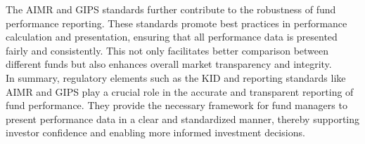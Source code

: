 \documentclass[a4paper,10pt]{article}
\begin{document}
\noindent The AIMR and GIPS standards further contribute to the robustness of fund performance reporting. These standards promote best practices in performance calculation and presentation, ensuring that all performance data is presented fairly and consistently. This not only facilitates better comparison between different funds but also enhances overall market transparency and integrity. \\

\noindent In summary, regulatory elements such as the KID and reporting standards like AIMR and GIPS play a crucial role in the accurate and transparent reporting of fund performance. They provide the necessary framework for fund managers to present performance data in a clear and standardized manner, thereby supporting investor confidence and enabling more informed investment decisions. \\
\end{document}
